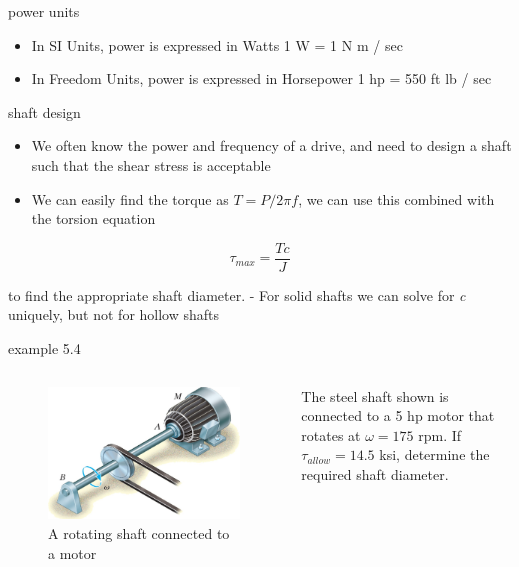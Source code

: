 \documentclass[
  letterpaper,
  ignorenonframetext,
  aspectratio=43,
  handout,
  12pt]{beamer}
\providecommand{\tightlist}{%
  \setlength{\itemsep}{0pt}\setlength{\parskip}{0pt}}
\providecommand{\tightlist}{%
\setlength{\itemsep}{0pt}\setlength{\parskip}{0pt}}
\let\Oldincludegraphics\includegraphics
\renewcommand{\includegraphics}[2][]{\Oldincludegraphics[width=\textwidth,height=0.7\textheight,keepaspectratio]{#2}}
\begin{document}
\begin{frame}{power units}
\protect\hypertarget{power-units}{}
\begin{itemize}
\tightlist
\item
  In SI Units, power is expressed in Watts 1 W = 1 N m / sec
\item
  In Freedom Units, power is expressed in Horsepower 1 hp = 550 ft lb /
  sec
\end{itemize}
\end{frame}

\begin{frame}{shaft design}
\protect\hypertarget{shaft-design}{}
\begin{itemize}
\tightlist
\item
  We often know the power and frequency of a drive, and need to design a
  shaft such that the shear stress is acceptable
\item
  We can easily find the torque as \(T=P/2\pi f\), we can use this
  combined with the torsion equation
\end{itemize}

\[\tau_{max} = \frac{Tc}{J}\]

to find the appropriate shaft diameter. - For solid shafts we can solve
for \emph{c} uniquely, but not for hollow shafts
\end{frame}

\begin{frame}{example 5.4}
\protect\hypertarget{example-5.4}{}
\begin{columns}[T]
\begin{column}{0.5\textwidth}
\begin{figure}
\centering
\includegraphics{../images/example-5-4.jpg}
\caption{A rotating shaft connected to a motor}
\end{figure}
\end{column}

\begin{column}{0.5\textwidth}
The steel shaft shown is connected to a 5 hp motor that rotates at
\(\omega=175\) rpm. If \(\tau_{allow}=14.5\) ksi, determine the required
shaft diameter.
\end{column}
\end{columns}
\end{frame}
\end{document}
